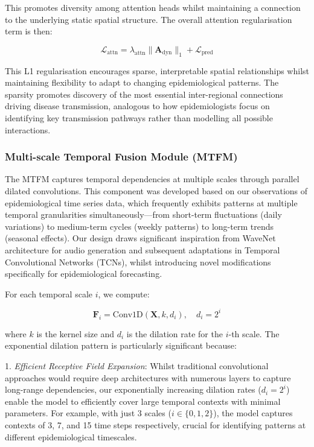 \documentclass[lettersize, journal]{IEEEtran}
\begin{document}
This promotes diversity among attention heads whilst maintaining a connection to the underlying static spatial structure. The overall attention regularisation term is then:

\begin{equation}
\mathcal{L}_{\text{attn}} = \lambda_{\text{attn}}\|\mathbf{A}_{\text{dyn}}\|_1 + \mathcal{L}_{\text{pred}}
\end{equation}

This L1 regularisation encourages sparse, interpretable spatial relationships whilst maintaining flexibility to adapt to changing epidemiological patterns. The sparsity promotes discovery of the most essential inter-regional connections driving disease transmission, analogous to how epidemiologists focus on identifying key transmission pathways rather than modelling all possible interactions.

\subsubsection{Multi-scale Temporal Fusion Module (MTFM)}
The MTFM captures temporal dependencies at multiple scales through parallel dilated convolutions. This component was developed based on our observations of epidemiological time series data, which frequently exhibits patterns at multiple temporal granularities simultaneously—from short-term fluctuations (daily variations) to medium-term cycles (weekly patterns) to long-term trends (seasonal effects). Our design draws significant inspiration from WaveNet architecture for audio generation and subsequent adaptations in Temporal Convolutional Networks (TCNs), whilst introducing novel modifications specifically for epidemiological forecasting.

For each temporal scale $i$, we compute:

\begin{equation}
\mathbf{F}_i = \text{Conv1D}(\mathbf{X}, k, d_i), \quad d_i = 2^i
\end{equation}

where $k$ is the kernel size and $d_i$ is the dilation rate for the $i$-th scale. The exponential dilation pattern is particularly significant because:

1. \textit{Efficient Receptive Field Expansion}: Whilst traditional convolutional approaches would require deep architectures with numerous layers to capture long-range dependencies, our exponentially increasing dilation rates ($d_i = 2^i$) enable the model to efficiently cover large temporal contexts with minimal parameters. For example, with just 3 scales ($i \in \{0,1,2\}$), the model captures contexts of 3, 7, and 15 time steps respectively, crucial for identifying patterns at different epidemiological timescales.
\end{document}
